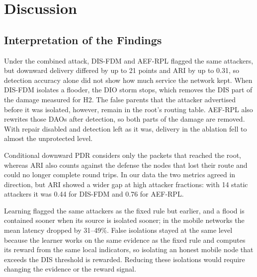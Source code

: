 \section{Discussion}\label{sec:discussion}
\subsection{Interpretation of the Findings}
Under the combined attack, DIS-FDM and AEF-RPL flagged the same attackers, but downward delivery differed by up to 21 points and ARI by up to 0.31, so detection accuracy alone did not show how much service the network kept. When DIS-FDM isolates a flooder, the DIO storm stops, which removes the DIS part of the damage measured for H2. The false parents that the attacker advertised before it was isolated, however, remain in the root's routing table. AEF-RPL also rewrites those DAOs after detection, so both parts of the damage are removed. With repair disabled and detection left as it was, delivery in the ablation fell to almost the unprotected level.

Conditional downward PDR considers only the packets that reached the root, whereas ARI also counts against the defense the nodes that lost their route and could no longer complete round trips. In our data the two metrics agreed in direction, but ARI showed a wider gap at high attacker fractions: with 14 static attackers it was 0.44 for DIS-FDM and 0.76 for AEF-RPL.

Learning flagged the same attackers as the fixed rule but earlier, and a flood is contained sooner when its source is isolated sooner; in the mobile networks the mean latency dropped by 31--49\%. False isolations stayed at the same level because the learner works on the same evidence as the fixed rule and computes its reward from the same local indicators, so isolating an honest mobile node that exceeds the DIS threshold is rewarded. Reducing these isolations would require changing the evidence or the reward signal.

